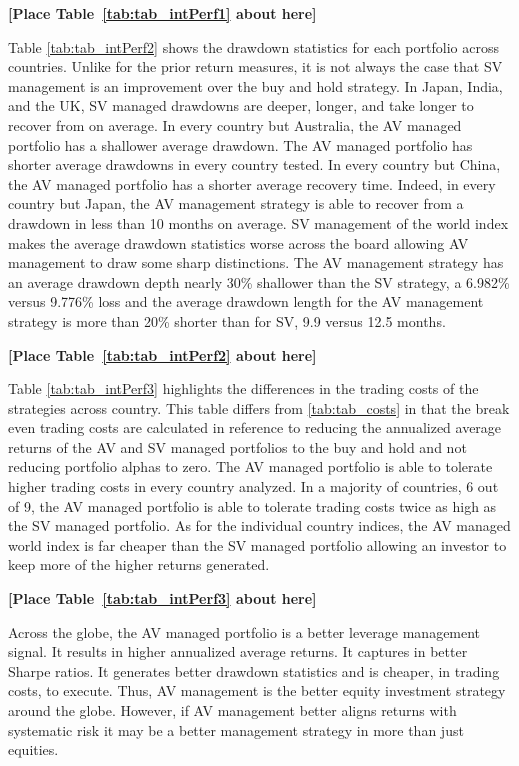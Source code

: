 \bigskip
\centerline{\bf [Place Table~\ref{tab:tab_intPerf1} about here]}
\bigskip

Table \ref{tab:tab_intPerf2} shows the drawdown statistics for each portfolio across countries. Unlike for the prior return measures, it is not always the case that SV management is an improvement over the buy and hold strategy. In Japan, India, and the UK, SV managed drawdowns are deeper, longer, and take longer to recover from on average. In every country but Australia, the AV managed portfolio has a shallower average drawdown. The AV managed portfolio has shorter average drawdowns in every country tested. In every country but China, the AV managed portfolio has a shorter average recovery time. Indeed, in every country but Japan, the AV management strategy is able to recover from a drawdown in less than 10 months on average. SV management of the world index makes the average drawdown statistics worse across the board allowing AV management to draw some sharp distinctions. The AV management strategy has an average drawdown depth nearly 30\% shallower than the SV strategy, a 6.982\% versus 9.776\% loss and the average drawdown length for the AV management strategy is more than 20\% shorter than for SV, 9.9 versus 12.5 months.

\bigskip
\centerline{\bf [Place Table~\ref{tab:tab_intPerf2} about here]}
\bigskip

Table \ref{tab:tab_intPerf3} highlights the differences in the trading costs of the strategies across country. This table differs from \ref{tab:tab_costs} in that the break even trading costs are calculated in reference to reducing the annualized average returns of the AV and SV managed portfolios to the buy and hold and not reducing portfolio alphas to zero. The AV managed portfolio is able to tolerate higher trading costs in every country analyzed. In a majority of countries, 6 out of 9, the AV managed portfolio is able to tolerate trading costs twice as high as the SV managed portfolio. As for the individual country indices, the AV managed world index is far cheaper than the SV managed portfolio allowing an investor to keep more of the higher returns generated.

\bigskip
\centerline{\bf [Place Table~\ref{tab:tab_intPerf3} about here]}
\bigskip

Across the globe, the AV managed portfolio is a better leverage management signal. It results in higher annualized average returns. It captures in better Sharpe ratios. It generates better drawdown statistics and is cheaper, in trading costs, to execute. Thus, AV management is the better equity investment strategy around the globe. However, if AV management better aligns returns with systematic risk it may be a better management strategy in more than just equities.